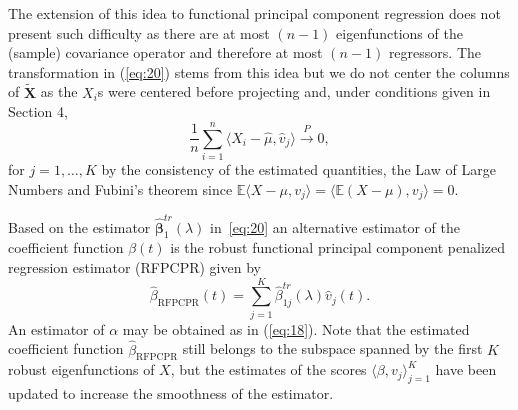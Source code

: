 \documentclass[11pt]{article}
\begin{document}
The extension of this idea to functional principal component regression does not present such difficulty as there are at most $(n-1)$ eigenfunctions of the (sample) covariance operator and therefore at most $(n-1)$  regressors. The transformation in (\ref{eq:20}) stems from this idea but we do not center the columns of $\widetilde{\mathbf{X}}$ as the $X_i$s were centered before projecting and, under conditions given in Section 4, 
\begin{equation}
\frac{1}{n}\sum_{i=1}^n \langle X_i - \widehat{\mu}, \widehat{v}_j \rangle \xrightarrow{P} 0,
\end{equation}
for $j = 1, \ldots, K$ by the consistency of the estimated quantities, the Law of Large Numbers and Fubini's theorem since $\mathbb{E} \langle X - \mu, v_j \rangle = \langle \mathbb{E}(X-\mu), v_j \rangle = 0$.


Based on the estimator $\widehat{\boldsymbol{\beta}}^{tr}_{1}\left(\lambda \right)$ in~\eqref{eq:20} an alternative estimator of the coefficient function $\beta(t)$ is the robust functional principal component penalized regression estimator (RFPCPR) given by 
\begin{equation}
\label{eq:23}
 \widehat{\beta}_{{\scriptscriptstyle \text{RFPCPR}}}(t)  = \sum_{j=1}^K \widehat{\beta}_{1j}^{tr}(\lambda) \widehat{v}_j (t).
\end{equation}
An estimator of $\alpha$ may be obtained as in (\ref{eq:18}). Note that the estimated coefficient function $\widehat{\beta}_{{\scriptscriptstyle \text{RFPCPR}}}$ still belongs to the subspace spanned by the first $K$ robust eigenfunctions of $X$, but the estimates of the scores $\langle \beta, v_j \rangle_{j=1}^K$ have been updated to increase the smoothness of the estimator. 
\end{document}
